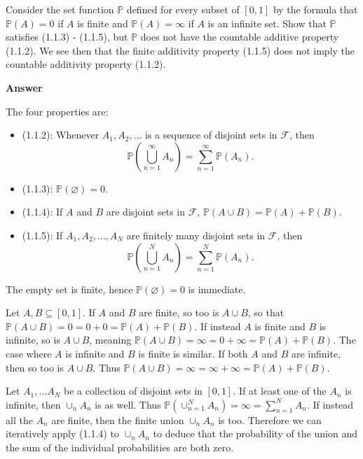 \documentclass[11pt]{article}
\renewcommand\P{\mathbb{P}} %
\newcommand\cF{\mathcal{F}}
\newcounter{question}[section]
\newenvironment{hwanswer}
    {
        \vspace{2mm}
        {\bfseries Answer}
        \vspace{-\abovedisplayskip}
        \begin{center}
            \begin{tcolorbox}[
                width=0.95\textwidth,
                colback=white,
                colframe=white,
                opacityback=0,
                opacityframe=0,
                boxrule=0pt,
                frame hidden,
                breakable,
                before upper={\parindent15pt} %
            ]
            \lineskip=0pt %
    }
    {
        \end{tcolorbox}
        \end{center}
        \vspace{4mm}
    }
\begin{document}
    \begin{hwquestion}
        Consider the set function $\P$ defined for every subset of $[0, 1]$ by the formula
        that $\P(A) = 0$ if $A$ is finite and $\P(A) = \infty$ if $A$ is an infinite set.
        Show that $\P$ satisfies (1.1.3) - (1.1.5), but $\P$ does not have the countable
        additive property (1.1.2). We see then that the finite additivity property (1.1.5)
        does not imply the countable additivity property (1.1.2).
    \end{hwquestion}

    \begin{hwanswer}
        The four properties are:
        \begin{itemize}
            \item (1.1.2): Whenever $A_1, A_2, \dots$ is a sequence of disjoint sets in
            $\cF$, then
            \[
                \P\left(
                    \bigcup_{n=1}^{\infty} A_n
                \right)
                =
                \sum_{n=1}^{\infty} \P(A_n).
            \]
            \item (1.1.3): $\P(\varnothing) = 0$.
            \item (1.1.4): If $A$ and $B$ are disjoint sets in $\cF$, $\P(A \cup B) = \P(A)
            + \P(B)$.
            \item (1.1.5): If $A_1, A_2, \dots, A_N$ are finitely many disjoint sets in $\cF$,
            then
            \[
                \P\left(
                    \bigcup_{n=1}^{N} A_n
                \right)
                =
                \sum_{n=1}^{N} \P(A_n).
            \]
        \end{itemize}

        The empty set is finite, hence $\P(\varnothing) = 0$ is immediate.

        Let $A, B \subseteq [0, 1]$. If $A$ and $B$ are finite, so too is $A \cup B$, so
        that $\P(A \cup B) = 0 = 0 + 0 = \P(A) + \P(B)$. If instead $A$ is finite and $B$ is
        infinite, so is $A \cup B$, meaning $\P(A \cup B) = \infty = 0 + \infty = \P(A) +
        \P(B)$. The case where $A$ is infinite and $B$ is finite is similar. If both $A$ and
        $B$ are infinite, then so too is $A \cup B$. Thus $\P(A \cup B) = \infty = \infty +
        \infty = \P(A) + \P(B)$.

        Let $A_1, \dots A_N$ be a collection of disjoint sets in $[0, 1]$. If at least one
        of the $A_n$ is infinite, then $\cup_{n} A_n$ is as well. Thus
        $%
            \P\left(
                \cup_{n=1}^{N} A_n
            \right)
            =
            \infty
            =
            \sum_{n=1}^{N} A_n.
        $%
        If instead all the $A_{n}$ are finite, then the finite union $\cup_{n} A_n$ is too.
        Therefore we can iteratively apply (1.1.4) to $\cup_{n} A_n$ to deduce that the
        probability of the union and the sum of the individual probabilities are both zero.


\end{hwanswer}
\end{document}
